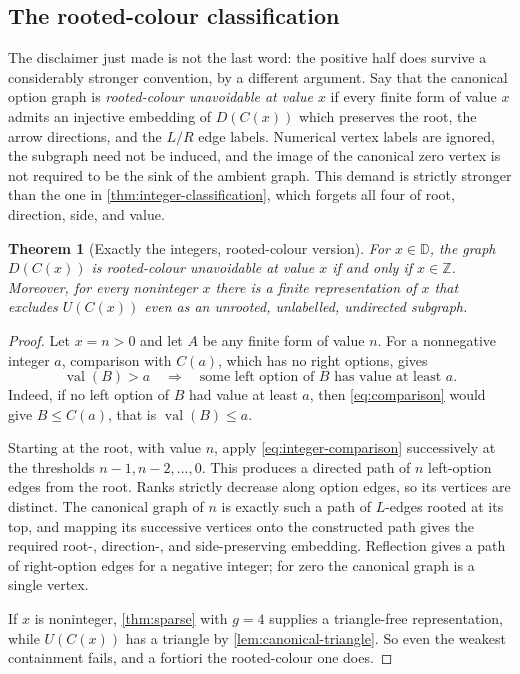 \documentclass[11pt,a4paper]{article}
\numberwithin{equation}{section}
\newtheorem{theorem}{Theorem}[section]
\theoremstyle{definition}
\theoremstyle{remark}
\newcommand{\D}{\mathbb{D}}
\newcommand{\Z}{\mathbb{Z}}
\newcommand{\val}{\operatorname{val}}
\newcommand{\can}{C}
\begin{document}
\subsection{The rooted-colour classification}

The disclaimer just made is not the last word: the positive half does survive a
considerably stronger convention, by a different argument. Say that the
canonical option graph is \emph{rooted-colour unavoidable at value $x$} if every
finite form of value $x$ admits an injective embedding of $D(\can(x))$ which
preserves the root, the arrow directions, and the $L/R$ edge labels. Numerical
vertex labels are ignored, the subgraph need not be induced, and the image of the
canonical zero vertex is not required to be the sink of the ambient graph. This
demand is strictly stronger than the one in \cref{thm:integer-classification},
which forgets all four of root, direction, side, and value.

\begin{theorem}[Exactly the integers, rooted-colour version]
\label{thm:classification-rooted}
For $x\in\D$, the graph $D(\can(x))$ is rooted-colour unavoidable at value $x$ if
and only if $x\in\Z$. Moreover, for every noninteger $x$ there is a finite
representation of $x$ that excludes $U(\can(x))$ even as an unrooted,
unlabelled, undirected subgraph.
\end{theorem}

\begin{proof}
Let $x=n>0$ and let $A$ be any finite form of value $n$. For a nonnegative
integer $a$, comparison with $\can(a)$, which has no right options, gives
\begin{equation}
\label{eq:integer-comparison}
 \val(B)>a
 \quad\Longrightarrow\quad
 \text{some left option of }B\text{ has value at least }a .
\end{equation}
Indeed, if no left option of $B$ had value at least $a$, then
\eqref{eq:comparison} would give $B\leq\can(a)$, that is $\val(B)\leq a$.

Starting at the root, with value $n$, apply \eqref{eq:integer-comparison}
successively at the thresholds $n-1,n-2,\ldots,0$. This produces a directed path
of $n$ left-option edges from the root. Ranks strictly decrease along option
edges, so its vertices are distinct. The canonical graph of $n$ is exactly such a
path of $L$-edges rooted at its top, and mapping its successive vertices onto the
constructed path gives the required root-, direction-, and side-preserving
embedding. Reflection gives a path of right-option edges for a negative integer;
for zero the canonical graph is a single vertex.

If $x$ is noninteger, \cref{thm:sparse} with $g=4$ supplies a triangle-free
representation, while $U(\can(x))$ has a triangle by
\cref{lem:canonical-triangle}. So even the weakest containment fails, and a
fortiori the rooted-colour one does.
\end{proof}
\end{document}
